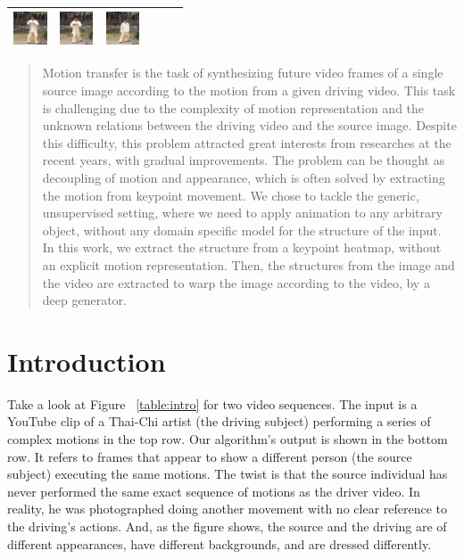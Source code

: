 \documentclass{article}
\begin{document}
\begin{table}[t]
\begin{center}
\begin{small}
\begin{sc}
\begin{tabular}{m{1.0cm}m{1.0cm}m{1.0cm}m{1.0cm}m{1.0cm}m{1.0cm}}
\includegraphics[width=1cm, height=1cm]{images/intro_image/animate_4.png} &
\includegraphics[width=1cm, height=1cm]{images/intro_image/animate_5.png} &
\includegraphics[width=1cm, height=1cm]{images/intro_image/animate_6.png}\\
\bottomrule
\end{tabular}
\end{sc}
\end{small}
\end{center}
\vskip -0.1in
\end{table}

\begin{abstract}
Motion transfer is the task of synthesizing future video frames of a single
source image according to the motion from a given driving video.
This task is challenging due to the complexity of motion representation
and the unknown relations between the driving video and the source image.
Despite this difficulty, this problem attracted great interests from
researches at the recent years, with gradual improvements. The
problem can be thought as decoupling of motion and appearance, which is
often solved by extracting the motion from keypoint movement.
We chose to tackle the generic, unsupervised setting, where we need to apply
animation to any arbitrary object, without any domain specific model for the
structure of the input.
In this work, we extract the structure from a keypoint heatmap, without an
explicit motion representation. Then, the structures from the image and the
video are extracted to warp the image according to the video, by a deep
generator.
\end{abstract}

\section{Introduction}
Take a look at Figure ~\ref{table:intro} for two video sequences. The input
is a YouTube clip of a Thai-Chi artist (the driving subject) performing a
series of complex motions in the top row. Our algorithm's output is shown in
the bottom row. It refers to frames that appear to show a different person
(the source subject) executing the same motions. The twist is that the
source individual has never performed the same exact sequence of motions as
the driver video. In reality, he was photographed doing another movement
with no clear reference to the driving's actions.
And, as the figure shows, the source and the driving are of different
appearances, have different backgrounds, and are dressed differently.
\end{document}
